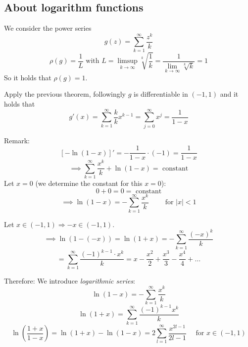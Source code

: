 \documentclass[a4paper,landscape,twocolumn]{article}
\theoremstyle{definition}
\newcommand\abs[1]{\left|#1\right|}
\begin{document}
\subsection{About logarithm functions}
%
We consider the power series
\[ g(z) = \sum_{k=1}^\infty \frac{z^k}{k} \]
\[ \rho(g) = \frac1L \text{ with } L = \limsup_{k\to\infty} \sqrt[k]{\frac1k} = \frac{1}{\lim_{k\to\infty} \sqrt[k]{k}} = 1 \]
So it holds that $\rho(g) = 1$.

Apply the previous theorem, followingly $g$ is differentiable in $(-1,1)$ and it holds that
\[ g'(x) = \sum_{k=1}^\infty \frac{k}{k} x^{k-1} = \sum_{j=0}^\infty x^j = \frac1{1 - x} \]

Remark:
\[ \left[-\ln(1 - x)\right]' = -\frac{1}{1 - x} \cdot (-1) = \frac1{1 - x} \]
\[ \implies \sum_{k=1}^\infty \frac{x^k}{k} + \ln(1 - x) = \text{ constant} \]
Let $x = 0$ (we determine the constant for this $x=0$):
\[ 0 + 0 = 0 = \text{ constant} \]
\[ \implies \ln(1 - x) = -\sum_{k=1}^\infty \frac{x^k}{k} \qquad \text{ for } \abs{x} < 1 \]

Let $x \in (-1,1) \Rightarrow -x \in (-1,1)$.
\[ \implies \ln(1 - (-x)) = \ln(1 + x) = -\sum_{k=1}^\infty \frac{(-x)^k}{k} \]
\[ = \sum_{k=1}^\infty \frac{(-1)^{k-1} \cdot x^k}{k} = x - \frac{x^2}{2} + \frac{x^3}{3} - \frac{x^4}{4} + \ldots \]

Therefore: We introduce \emph{logarithmic series}:
\[ \ln(1 - x) = -\sum_{k=1}^\infty \frac{x^k}{k} \]
\[ \ln(1 + x) = \sum_{k=1}^\infty \frac{(-1)^{k-1} x^k}{k} \]
\[
  \ln\left(\frac{1 + x}{1 - x}\right)
  = \ln(1 + x) - \ln(1 - x)
  = 2 \sum_{l=1}^\infty \frac{x^{2l - 1}}{2l - 1}
  \quad \text{ for } x \in (-1,1)
\]
\end{document}
